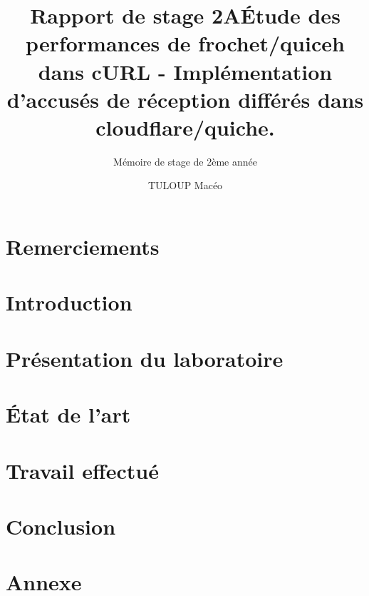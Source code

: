 \documentclass{rapport_de_stage}
\title{Rapport de stage 2A} %
\title{Étude des performances de frochet/quiceh dans cURL - Implémentation d'accusés de réception différés dans cloudflare/quiche.}
\subtitle{Mémoire de stage de 2ème année}
\author{TULOUP Macéo}
\begin{document}
\maketitle

\section{Remerciements}

\newpage


\newpage

\fairemarges

\toc %



\section{Introduction}

\newpage


\section{Présentation du laboratoire}

\newpage


\section{État de l'art}

\newpage


\section{Travail effectué}

\newpage


\section{Conclusion} 

\newpage


\printbibliography[heading=bibintoc, title={~~~~Bibliographie}]
\newpage


\section{Annexe}

\newpage
\end{document}
